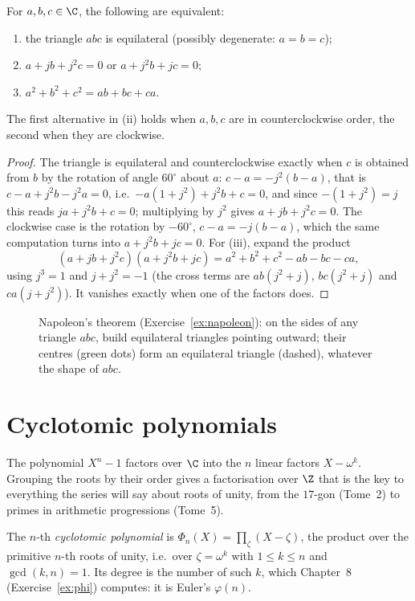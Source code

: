 \begin{proposition}\label{prop:equilateral}
For $a,b,c\in\C$, the following are equivalent:
\begin{enumerate}[label=(\roman*)]
\item the triangle $abc$ is equilateral (possibly degenerate: $a=b=c$);
\item $a+jb+j^2c=0$ or $a+j^2b+jc=0$;
\item $a^2+b^2+c^2=ab+bc+ca$.
\end{enumerate}
The first alternative in (ii) holds when $a,b,c$ are in counterclockwise order, the second when they are clockwise.
\end{proposition}
\begin{proof}
The triangle is equilateral and counterclockwise exactly when $c$ is obtained from $b$ by the rotation of angle $60^\circ$ about $a$:
$c-a=-j^2(b-a)$, that is $c-a+j^2b-j^2a=0$, i.e.\ $-a(1+j^2)+j^2b+c=0$, and since $-(1+j^2)=j$ this reads $ja+j^2b+c=0$; multiplying by $j^2$ gives $a+jb+j^2c=0$.
The clockwise case is the rotation by $-60^\circ$, $c-a=-j(b-a)$, which the same computation turns into $a+j^2b+jc=0$. For (iii), expand the product
\[
(a+jb+j^2c)(a+j^2b+jc)=a^2+b^2+c^2-ab-bc-ca,
\]
using $j^3=1$ and $j+j^2=-1$ (the cross terms are $ab(j^2+j)$, $bc(j^2+j)$ and $ca(j+j^2)$). It vanishes exactly when one of the factors does.
\end{proof}

\begin{figure}[ht]
\centering
{}
\caption{Napoleon's theorem (Exercise~\ref{ex:napoleon}): on the sides of any triangle $abc$, build equilateral triangles pointing outward; their centres (green dots) form an equilateral triangle (dashed), whatever the shape of $abc$.}
\label{fig:napoleon}
\end{figure}

\section{Cyclotomic polynomials}

The polynomial $X^n-1$ factors over $\C$ into the $n$ linear factors $X-\omega^k$. Grouping the roots by their order gives a factorisation over $\Z$
that is the key to everything the series will say about roots of unity, from the $17$-gon (Tome~2) to primes in arithmetic progressions (Tome~5).

\begin{definition}\label{def:cyclotomic}
The $n$-th \emph{cyclotomic polynomial} is $\Phi_n(X)=\prod_\zeta(X-\zeta)$, the product over the primitive $n$-th roots of unity, i.e.\ over
$\zeta=\omega^k$ with $1\le k\le n$ and $\gcd(k,n)=1$. Its degree is the number of such $k$, which Chapter~8 (Exercise~\ref{ex:phi}) computes: it is Euler's $\varphi(n)$.
\end{definition}

